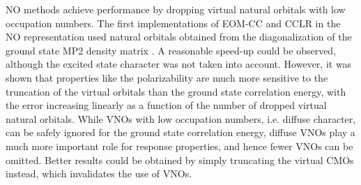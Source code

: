 NO methods achieve performance by dropping virtual natural orbitals with low occupation numbers. The first implementations of EOM-CC and CCLR in the NO representation used natural orbitals obtained from the diagonalization of the ground state MP2 density matrix \cite{Lan2010}. A reasonable speed-up could be observed, although the excited state character was not taken into account. However, it was shown \cite{Kum2017} that properties like the polarizability are much more sensitive to the truncation of the virtual orbitals than the ground state correlation energy, with the error increasing linearly as a function of the number of dropped virtual natural orbitals. While VNOs with low occupation numbers, i.e. diffuse character, can be safely  ignored for the ground state correlation energy, diffuse VNOs play a much more important role for response properties, and hence fewer VNOs can be omitted. Better results could be obtained by simply truncating the virtual CMOs instead, which invalidates the use of VNOs. 

